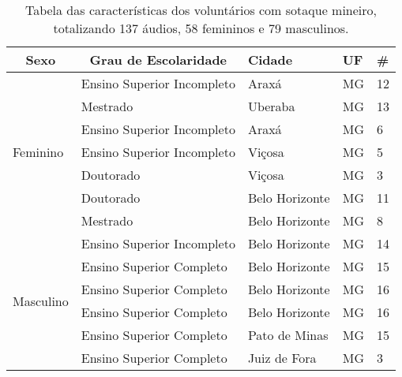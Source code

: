 \begin{table}[h]
\caption{Tabela das características dos voluntários com sotaque mineiro, totalizando 137 áudios, 58 femininos e 79 masculinos.} \label{Tabela_mineiro}
\begin{tabular}{|l|l|l|l|l|}
\hline
\multicolumn{1}{|c|}{Sexo} & \multicolumn{1}{c|}{Grau de Escolaridade} & Cidade         & UF & \# \\ \hline
\multirow{7}{*}{Feminino}  & Ensino Superior Incompleto                & Araxá          & MG & 12 \\ \cline{2-5} 
                           & Mestrado                                  & Uberaba        & MG & 13 \\ \cline{2-5} 
                           & Ensino Superior Incompleto                & Araxá          & MG & 6  \\ \cline{2-5} 
                           & Ensino Superior Incompleto                & Viçosa         & MG & 5  \\ \cline{2-5} 
                           & Doutorado                                 & Viçosa         & MG & 3  \\ \cline{2-5} 
                           & Doutorado                                 & Belo Horizonte & MG & 11 \\ \cline{2-5} 
                           & Mestrado                                  & Belo Horizonte & MG & 8  \\ \hline
\multirow{6}{*}{Masculino} & Ensino Superior Incompleto                & Belo Horizonte & MG & 14 \\ \cline{2-5} 
                           & Ensino Superior Completo                  & Belo Horizonte & MG & 15 \\ \cline{2-5} 
                           & Ensino Superior Completo                  & Belo Horizonte & MG & 16 \\ \cline{2-5} 
                           & Ensino Superior Completo                  & Belo Horizonte & MG & 16 \\ \cline{2-5} 
                           & Ensino Superior Completo                  & Pato de Minas  & MG & 15 \\ \cline{2-5} 
                           & Ensino Superior Completo                  & Juiz de Fora   & MG & 3  \\ \hline
\end{tabular}
\end{table}

